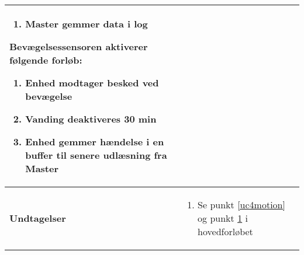 \begin{center}
\begin{longtable}{|p{5cm}|p{9cm}|}
\begin{enumerate}[resume]
				\item Master gemmer data i log
			\end{enumerate}
			
			
			 Bevægelsessensoren aktiverer følgende forløb:
			\begin{enumerate}[resume]
			
				\item \label{uc4motion} Enhed modtager besked ved bevægelse 
				
				\item \label{uc4deactivate} Vanding deaktiveres 30 min	
				
				\item Enhed gemmer hændelse i en buffer til senere udlæsning fra Master 
				
			\end{enumerate}\\\hline

		\textbf{Undtagelser}
			&\begin{enumerate}[label=\ref{uc4vandstart}.a.]
			
				\item Se punkt \ref{uc4motion} og punkt \ref{uc4deactivate} i hovedforløbet	
			
			\end{enumerate}\\\hline
			
	\end{longtable}
\end{center}

